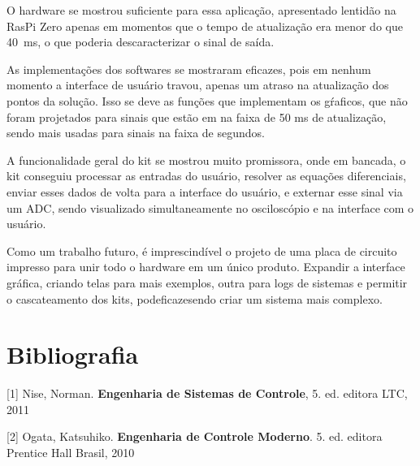 \documentclass[journal]{IEEEtranTIE}
\begin{document}
O hardware se mostrou suficiente para essa aplicação, apresentado lentidão na RasPi Zero apenas em momentos que o tempo de atualização era menor do que \SI{40}{\milli\second}, o que poderia descaracterizar o sinal de saída.

As implementações dos softwares se mostraram eficazes, pois em nenhum momento a interface de usuário travou, apenas um atraso na atualização dos pontos da solução. Isso se deve as funções que implementam os gŕaficos, que não foram projetados para sinais que estão em na faixa de 50 ms de atualização, sendo mais usadas para sinais na faixa de segundos.

A funcionalidade geral do kit se mostrou muito promissora, onde em bancada, o kit conseguiu processar as entradas do usuário, resolver as equações diferenciais, enviar esses dados de volta para a interface do usuário, e externar esse sinal via um ADC, sendo visualizado simultaneamente no osciloscópio e na interface com o usuário.

Como um trabalho futuro, é imprescindível o projeto de uma placa de circuito impresso para unir todo o hardware em um único produto. Expandir a interface gráfica, criando telas para mais exemplos, outra para logs de sistemas e permitir o cascateamento dos kits, podeficazesendo criar um sistema mais complexo.


 \section{Bibliografia}
[1] Nise, Norman. \textbf{Engenharia de Sistemas de Controle}, 5. ed. editora LTC, 2011

[2] Ogata, Katsuhiko. \textbf{Engenharia de Controle Moderno}. 5. ed. editora Prentice Hall Brasil, 2010
\end{document}

